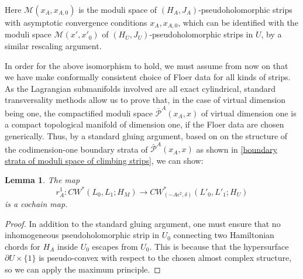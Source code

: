 \documentclass{amsart}
\newtheorem{lemma}[theorem]{Lemma}
\numberwithin{equation}{section}
\numberwithin{figure}{section}
\begin{document}
Here $\mathcal{M}(x_{A}, x_{A, 0})$ is the moduli space of $(H_{A}, J_{A})$-pseudoholomorphic strips with asymptotic convergence conditions $x_{A}, x_{A, 0}$, which can be identified with the moduli space $\mathcal{M}(x', x'_{0})$ of $(H_{U}, J_{U})$-pseudoholomorphic strips in $U$, by a similar rescaling argument. \par
	In order for the above isomorphism to hold, we must assume from now on that we have make conformally consistent choice of Floer data for all kinds of strips. As the Lagrangian submanifolds involved are all exact cylindrical, standard transversality methods allow us to prove that, in the case of virtual dimension being one, the compactified moduli space $\bar{\mathcal{P}}^{A}(x_{A}, x)$ of virtual dimension one is a compact topological manifold of dimension one, if the Floer data are chosen generically. Thus, by a standard gluing argument, based on on the structure of the codimension-one boundary strata of $\bar{\mathcal{P}}^{A}(x_{A}, x)$ as shown in \eqref{boundary strata of moduli space of climbing strips}, we can show: \par

\begin{lemma}
	The map
\begin{equation*}
r^{1}_{A}: CW^{*}(L_{0}, L_{1}; H_{M}) \to CW^{*}_{(-A\epsilon^{2}, \delta)}(L'_{0}, L'_{1}; H_{U})
\end{equation*}
is a cochain map.
\end{lemma}
\begin{proof}
	In addition to the standard gluing argument, one must ensure that no inhomogeneous pseudoholomorphic strip in $U_{0}$ connecting two Hamiltonian chords for $H_{A}$ inside $U_{0}$ escapes from $U_{0}$. This is because that the hypersurface $\partial U \times \{1\}$ is pseudo-convex with respect to the chosen almost complex structure, so we can apply the maximum principle. \par
\end{proof}
\end{document}
